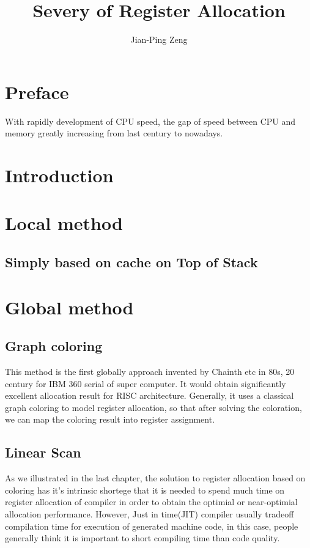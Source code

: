 \documentclass[12pt]{book}
\title{Severy of Register Allocation}
\author{Jian-Ping Zeng}
\begin{document}
\maketitle
\tableofcontents
\chapter{Preface}
With rapidly development of CPU speed, the gap of speed between CPU and memory
greatly increasing from last century to nowadays.

\chapter{Introduction}

\chapter{Local method}
\section{Simply based on cache on Top of Stack}

\chapter{Global method}

\section{Graph coloring}
This method is the first globally approach invented by Chainth etc in 80s, 20
century for IBM 360 serial of super computer. It would obtain significantly
excellent allocation result for RISC architecture. Generally, it uses a
classical graph coloring to model register allocation, so that after solving the
coloration, we can map the coloring result into register assignment.

\section{Linear Scan}
As we illustrated in the last chapter, the solution to register allocation based
on coloring has it's intrinsic shortege that it is needed to spend much time on
register allocation of compiler in order to obtain the optimial or near-optimial
allocation performance. However, Just in time(JIT) compiler usually tradeoff compilation
time for execution of generated machine code, in this case, people generally
think it is important to short compiling time than code quality.
\end{document}
